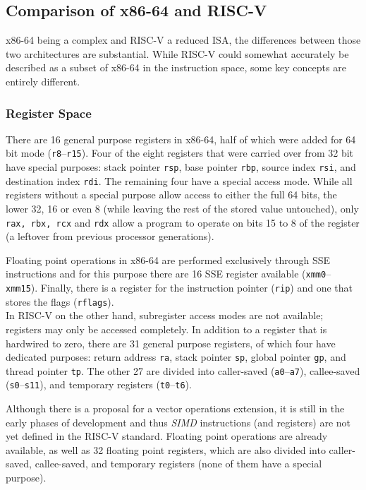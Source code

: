 \subsection{Comparison of x86-64 and RISC-V}
x86-64 being a complex and RISC-V a reduced ISA, the differences between those two architectures are substantial. While RISC-V could somewhat accurately be described as a subset of x86-64 in the instruction space, some key concepts are entirely different.

\subsubsection{Register Space}
There are 16 general purpose registers in x86-64, half of which were added for 64 bit mode (\texttt{r8}--\texttt{r15}). Four of the eight registers that were carried over from 32 bit have special purposes: stack pointer \texttt{rsp}, base pointer \texttt{rbp}, source index \texttt{rsi}, and destination index \texttt{rdi}. The remaining four have a special access mode. While all registers without a special purpose allow access to either the full 64 bits, the lower 32, 16 or even 8 (while leaving the rest of the stored value untouched), only \texttt{rax, rbx, rcx} and \texttt{rdx} allow a program to operate on bits 15 to 8 of the register (a leftover from previous processor generations).

Floating point operations in x86-64 are performed exclusively through SSE instructions and for this purpose there are 16 SSE register available (\texttt{xmm0}--\texttt{xmm15}). Finally, there is a register for the instruction pointer (\texttt{rip}) and one that stores the flags (\texttt{rflags}).\\

\noindent In RISC-V on the other hand, subregister access modes are not available; registers may only be accessed completely. In addition to a register that is hardwired to zero, there are 31 general purpose registers, of which four have dedicated purposes: return address \texttt{ra}, stack pointer \texttt{sp}, global pointer \texttt{gp}, and thread pointer \texttt{tp}. The other 27 are divided into caller-saved (\texttt{a0}--\texttt{a7}), callee-saved (\texttt{s0}--\texttt{s11}), and temporary registers (\texttt{t0}--\texttt{t6}).

Although there is a proposal for a vector operations extension, it is still in the early phases of development and thus \emph{SIMD} instructions (and registers) are not yet defined in the RISC-V standard. Floating point operations are already available, as well as 32 floating point registers, which are also divided into caller-saved, callee-saved, and temporary registers (none of them have a special purpose).

